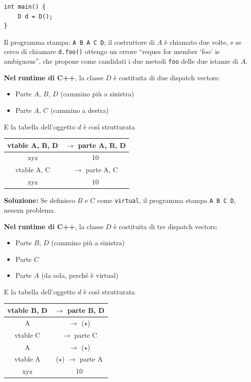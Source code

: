 \documentclass[a4paper,10pt]{article}
\begin{document}
\begin{lstlisting}
int main() {
    D d = D();
}
\end{lstlisting}
Il programma stampa: \texttt{A B A C D}; il costruttore di $A$ è chiamato due volte, e se cerco di chiamare \texttt{d.foo()} ottengo un errore ``reques for member `foo' is ambiguous'', che propone come candidati i due metodi \texttt{foo} delle due istanze di $A$.\smallskip

\textbf{Nel runtime di C++}, la classe $D$ è costituita di due dispatch vectors:
\begin{itemize}
 \item Parte $A$, $B$, $D$ (cammino più a sinistra)
 \item Parte $A$, $C$ (cammino a destra)
\end{itemize}

E la tabella dell'oggetto $d$ è così strutturata
\begin{center}

 \begin{tabular}{|c|c|}
  \hline
  vtable A, B, D & $\to$ parte A, B, D\\
  \hline
  xyz & 10\\
  \hline
  vtable A, C & $\to$ parte A, C\\
  \hline
  xyz & 10\\
  \hline
 \end{tabular}

\end{center}


\textbf{Soluzione:} Se definisco $B$ e $C$ come \texttt{virtual}, il programma stampa \texttt{A B C D}, nessun problema. \smallskip

\textbf{Nel runtime di C++}, la classe $D$ è costituita di tre dispatch vectors:
\begin{itemize}
 \item Parte $B$, $D$ (cammino più a sinistra)
 \item Parte $C$
 \item Parte $A$ (da sola, perché è virtual)
\end{itemize}

E la tabella dell'oggetto $d$ è così strutturata
\begin{center}

 \begin{tabular}{|c|c|}
  \hline
  vtable B, D & $\to$ parte B, D\\
   \hline
  A & $\to$ ($\star$)\\
  \hline
  vtable C & $\to$ parte C\\
   \hline
  A & $\to$ ($\star$)\\
  \hline
  vtable A &($\star$) $\to$ parte A\\
  \hline
  xyz & 10\\
  \hline
 \end{tabular}

\end{center}
\end{document}
